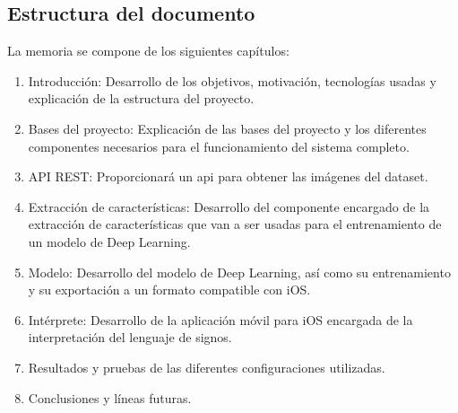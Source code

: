 \documentclass[../main.tex]{subfiles}
\begin{document}
\subsection{Estructura del documento}
La memoria se compone de los siguientes capítulos:
\begin{enumerate}
    \item Introducción: Desarrollo de los objetivos, motivación, tecnologías usadas y explicación de la estructura del proyecto.
    \item Bases del proyecto: Explicación de las bases del proyecto y los diferentes componentes necesarios para el funcionamiento del sistema completo.
    \item API REST: Proporcionará un api para obtener las imágenes del dataset.
    \item Extracción de características: Desarrollo del componente encargado de la extracción de características que van a ser usadas para el entrenamiento de un modelo de Deep Learning.
    \item Modelo: Desarrollo del modelo de Deep Learning, así como su entrenamiento y su exportación a un formato compatible con iOS.
    \item Intérprete: Desarrollo de la aplicación móvil para iOS encargada de la interpretación del lenguaje de signos.
    \item Resultados y pruebas de las diferentes configuraciones utilizadas.
    \item Conclusiones y líneas futuras.
\end{enumerate}
\end{document}
